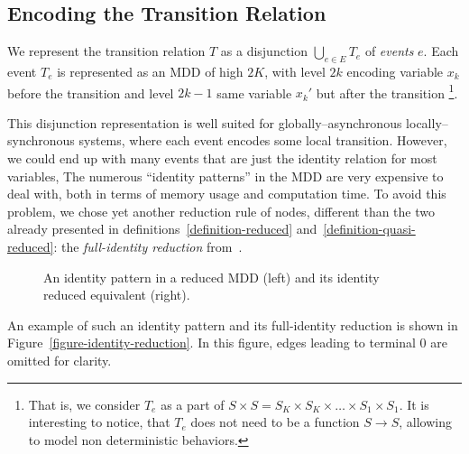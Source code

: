 \documentclass[nocover]             %
{NASA}                       %
\begin{document}
\subsection{Encoding the Transition Relation}

We represent the transition relation $T$ as a disjunction
$\bigcup_{e \in E}T_e$ of \emph{events} $e$. Each event $T_e$
is represented as an MDD of high $2K$, with level $2k$
encoding variable $x_k$ before the transition and level $2k-1$
same variable $x_k'$ but after the transition%
\footnote{That is, we consider $T_e$ as a part of
$S \times S = S_K \times S_K \times \ldots \times S_1 \times S_1$.
It is interesting to notice, that $T_e$ does not need to be a function
$S \rightarrow S$, allowing to model non deterministic behaviors.}.

This disjunction representation is well suited for
globally--asynchronous locally--synchronous systems, where
each event encodes some local transition. 
However, we could end up with many events that are just the identity relation for most variables,
The numerous ``identity patterns'' in the MDD are  %
very expensive to deal with, both in terms of memory usage
and computation time. To avoid this problem, we chose yet another reduction rule of nodes,
different than the two already presented in definitions~\vref{definition-reduced}
and~\vref{definition-quasi-reduced}: the \emph{full-identity reduction} from~\cite{Ciardo2005}.

\begin{figure}[htbp]
  \centering
    
  \caption{An identity pattern in a reduced MDD (left) and its identity reduced equivalent (right).}
\label{figure-identity-reduction}
\end{figure}

An example of such an identity pattern and its full-identity
reduction is shown in Figure~\vref{figure-identity-reduction}. 
In this figure, edges leading to terminal $0$ are omitted for clarity.
\end{document}
